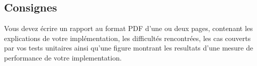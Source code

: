 \subsection{Consignes}
\label{sub:Consignes}

Vous devez écrire un rapport au format PDF d'une ou deux pages, contenant
les explications de votre implémentation, les difficultés rencontrées,
les cas couverts par vos tests unitaires ainsi qu'une figure montrant les
resultats d'une mesure de performance de votre implementation.
